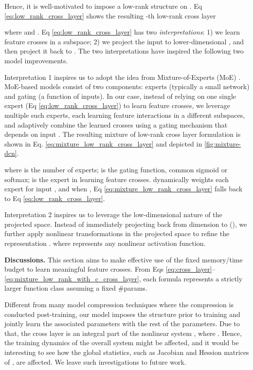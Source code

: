 \documentclass[sigconf]{acmart}
\begin{document}
Hence, it is well-motivated to impose a low-rank structure on . Eq \eqref{eq:low_rank_cross_layer} shows the resulting -th low-rank cross layer

where  and . Eq \eqref{eq:low_rank_cross_layer} has two \emph{interpretations}: 1) we learn feature crosses in a subspace; 2) we project the input  to lower-dimensional , and then project it back to . The two interpretations have inspired the following two model improvements.

Interpretation 1 inspires us to adopt the idea from Mixture-of-Experts (MoE) \cite{shazeer2017outrageously, jacobs1991adaptive, eigen2013learning, ma2018modeling}. MoE-based models consist of two components: experts (typically a small network) and gating (a function of inputs). In our case, instead of relying on one single expert (Eq \eqref{eq:low_rank_cross_layer}) to learn feature crosses, we leverage multiple such experts, each learning feature interactions in a different subspaces, and adaptively combine the learned crosses using a gating mechanism that depends on input . The resulting mixture of low-rank cross layer formulation is shown in Eq. \eqref{eq:mixture_low_rank_cross_layer} and depicted in \autoref{fig:mixture-dcn}.

where  is the number of experts;  is the gating function, common sigmoid or softmax;  is the  expert in learning feature crosses.  dynamically weights each expert for input , and when , Eq \eqref{eq:mixture_low_rank_cross_layer} falls back to Eq \eqref{eq:low_rank_cross_layer}. 

Interpretation 2 inspires us to leverage the low-dimensional nature of the projected space. Instead of immediately projecting back from dimension  to  (), we further apply nonlinear transformations in the projected space to refine the representation \cite{fan2019multiscale}.
where  represents any nonlinear activation function. 

{\bf Discussions.} This section aims to make effective use of the fixed memory/time budget to learn meaningful feature crosses. From Eqs \eqref{eq:cross_layer}--\eqref{eq:mixture_low_rank_with_c_cross_layer}, each formula represents a strictly larger function class assuming a fixed \#params. 

Different from many model compression techniques where the compression is conducted post-training, our model imposes the structure prior to training and jointly learn the associated parameters with the rest of the parameters. Due to that, the cross layer is an integral part of the nonlinear system , where . Hence, the training dynamics of the overall system might be affected, and it would be interesting to see how the global statistics, such as Jacobian and Hession matrices of , are affected. We leave such investigations to future work.
\end{document}
